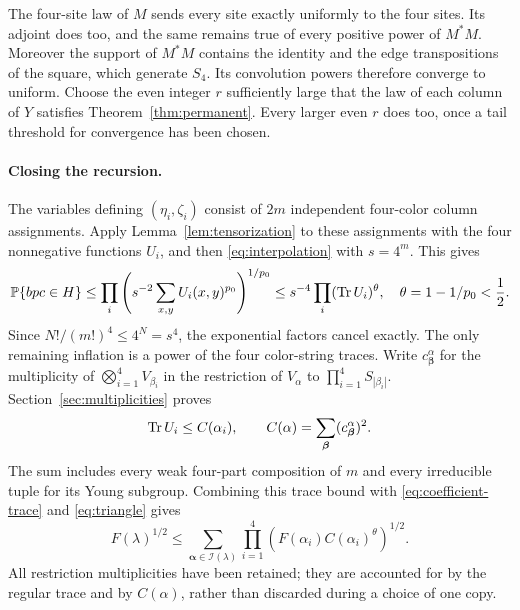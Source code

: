 The four-site law of $M$ sends every site exactly uniformly to the four sites. Its adjoint does too, and the same remains true of every positive power of $M^*M$. Moreover the support of $M^*M$ contains the identity and the edge transpositions of the square, which generate $S_4$. Its convolution powers therefore converge to uniform. Choose the even integer $r$ sufficiently large that the law of each column of $Y$ satisfies Theorem~\ref{thm:permanent}. Every larger even $r$ does too, once a tail threshold for convergence has been chosen.

\paragraph{Closing the recursion.}
The variables defining $(\eta_i,\zeta_i)$ consist of $2m$ independent
four-color column assignments. Apply Lemma~\ref{lem:tensorization} to
these assignments with the four nonnegative functions $U_i$, and then
\eqref{eq:interpolation} with $s=4^m$. This gives
\[
 \mathbb P\{bpc\in H\}
 \le\prod_i\left(s^{-2}\sum_{x,y}U_i(x,y)^{p_0}\right)^{1/p_0}
 \le s^{-4}\prod_i(\operatorname{Tr} U_i)^\theta,
 \quad\theta=1-1/p_0<\frac12.
\]
Since $N!/(m!)^4\le4^N=s^4$, the exponential factors cancel exactly. The only remaining inflation is a power of the four color-string traces. Write $c^\alpha_{\boldsymbol\beta}$ for the multiplicity of $\bigotimes_{i=1}^4V_{\beta_i}$ in the restriction of $V_\alpha$ to $\prod_{i=1}^4S_{|\beta_i|}$. Section~\ref{sec:multiplicities} proves
\begin{equation}\label{eq:trace-C}
 \operatorname{Tr} U_i\le C(\alpha_i),\qquad
 C(\alpha)=\sum_{\boldsymbol\beta}(c^{\alpha}_{\boldsymbol\beta})^2.
\end{equation}
The sum includes every weak four-part composition of $m$ and every
irreducible tuple for its Young subgroup. Combining this trace bound
with \eqref{eq:coefficient-trace} and \eqref{eq:triangle} gives
\begin{equation}\label{eq:recursion}
 F(\lambda)^{1/2}\le
 \sum_{\boldsymbol\alpha\in\mathcal I(\lambda)}
       \prod_{i=1}^4\left(F(\alpha_i)C(\alpha_i)^\theta\right)^{1/2}.
\end{equation}
All restriction multiplicities have been retained; they are accounted for by the regular trace and by $C(\alpha)$, rather than discarded during a choice of one copy.
